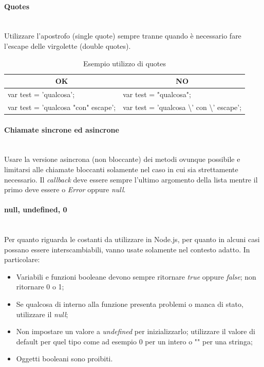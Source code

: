 \paragraph{Quotes}\mbox{}\\[0.4cm]
Utilizzare l'apostrofo (single quote) sempre tranne quando è necessario fare l'escape delle virgolette (double quotes).
\begin{table} [H]
	\begin{center}
		\begin{tabular}{ | l | l |}
			\multicolumn{1}{c}{\textbf{OK}}&\multicolumn{1}{c}{\textbf{NO}}\\ 
			\hline
			var test = 'qualcosa'; & var test = "qualcosa"; \\
			var test = 'qualcosa "con" escape'; & var test = 'qualcosa \textbackslash' con \textbackslash' escape';\\
			\hline
		\end{tabular}
	\end{center}
	\caption{Esempio utilizzo di quotes}
\end{table}

\paragraph{Chiamate sincrone ed asincrone}\mbox{}\\[0.4cm]
Usare la versione asincrona (non bloccante) dei metodi ovunque possibile e limitarsi alle chiamate bloccanti solamente nel caso in cui sia strettamente necessario. Il \textit{callback} deve essere sempre l'ultimo argomento della lista mentre il primo deve essere o \textit{Error} oppure \textit{null}.

\paragraph{null, undefined, 0}\mbox{}\\[0.4cm]
Per quanto riguarda le costanti da utilizzare in Node.js, per quanto in alcuni casi possano essere interscambiabili, vanno usate solamente nel contesto adatto. In particolare:

\begin{itemize}
    \item Variabili e funzioni booleane devono sempre ritornare \textit{true} oppure \textit{false}; non ritornare 0 o 1;
    \item Se qualcosa di interno alla funzione presenta problemi o manca di stato, utilizzare il \textit{null};
    \item Non impostare un valore a \textit{undefined} per inizializzarlo; utilizzare il valore di default per quel tipo come ad esempio 0 per un intero o "" per una stringa;
    \item Oggetti booleani sono proibiti.
\end{itemize}